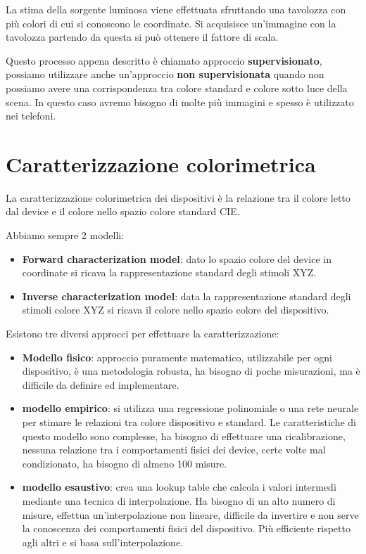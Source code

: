 La stima della sorgente luminosa viene effettuata sfruttando una tavolozza con
più colori di cui si conoscono le coordinate. Si acquisisce un'immagine con la
tavolozza partendo da questa si può ottenere il fattore di scala.

Questo processo appena descritto è chiamato approccio \textbf{supervisionato},
possiamo utilizzare anche un'approccio \textbf{non supervisionata} quando non
possiamo avere una corrispondenza tra colore standard e colore sotto luce della
scena. In questo caso avremo bisogno di molte più immagini e spesso è utilizzato nei 
telefoni.
\section{Caratterizzazione colorimetrica}
La caratterizzazione colorimetrica dei dispositivi è la relazione tra il colore
letto dal device e il colore nello spazio colore standard CIE.

Abbiamo sempre 2 modelli:
\begin{itemize}
    \item \textbf{Forward characterization model}: dato lo spazio colore del device
          in coordinate si ricava la rappresentazione standard degli stimoli XYZ.
    \item \textbf{Inverse characterization model}: data la rappresentazione standard
          degli stimoli colore XYZ si ricava il colore nello spazio colore del dispositivo.
\end{itemize}

Esistono tre diversi approcci per effettuare la caratterizzazione:
\begin{itemize}
    \item \textbf{Modello fisico}: approccio puramente matematico, utilizzabile
          per ogni dispositivo, è una metodologia robusta, ha bisogno di poche
          misurazioni, ma è difficile da definire ed implementare.
    \item \textbf{modello empirico}: si utilizza una regressione polinomiale o
          una rete neurale per stimare le relazioni tra colore dispositivo e
          standard. Le caratteristiche di questo modello sono complesse, ha
          bisogno di effettuare una ricalibrazione, nessuna relazione tra i
          comportamenti fisici dei device, certe volte mal condizionato, ha
          bisogno di almeno 100 misure.
    \item \textbf{modello esaustivo}: crea una lookup table che calcola i valori
          intermedi mediante una tecnica di interpolazione. Ha bisogno di un alto
          numero di misure, effettua un'interpolazione non lineare, difficile da
          invertire e non serve la conoscenza dei comportamenti fisici del dispositivo.
          Più efficiente rispetto agli altri e si basa sull'interpolazione.
\end{itemize}

